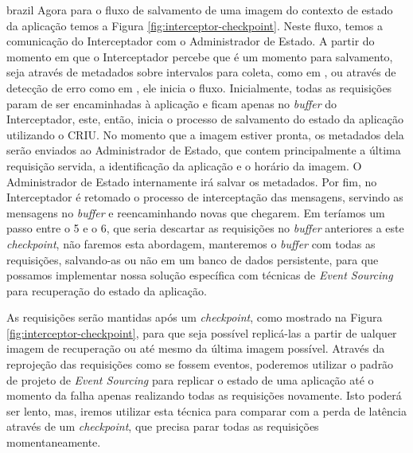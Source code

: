 \begin{otherlanguage*}{brazil}
Agora para o fluxo de salvamento de uma imagem do contexto de estado da aplicação temos a
Figura \ref{fig:interceptor-checkpoint}. Neste fluxo, temos a comunicação do Interceptador
com o Administrador de Estado. A partir do momento em que o Interceptador percebe que é um
momento para salvamento, seja através de metadados sobre intervalos para coleta, como em \cite{vayghan2021kubernetes}, ou através de detecção de erro como em \cite{tran2022proactive},
ele inicia o fluxo. Inicialmente, todas as requisições param de ser encaminhadas à aplicação
e ficam apenas no \textit{buffer} do Interceptador, este, então, inicia o processo de salvamento
do estado da aplicação utilizando o CRIU. No momento que a imagem estiver pronta, os metadados
dela serão enviados ao Administrador de Estado, que contem principalmente a última requisição
servida, a identificação da aplicação e o horário da imagem. O Administrador de Estado internamente
irá salvar os metadados. Por fim, no Interceptador é retomado o processo de interceptação das
mensagens, servindo as mensagens no \textit{buffer} e reencaminhando novas que chegarem. Em \cite{muller2022architecture} teríamos um passo entre o 5 e o 6, que seria descartar as requisições no \textit{buffer} anteriores a este \textit{checkpoint}, não faremos esta abordagem, manteremos o \textit{buffer} com todas as requisições, salvando-as ou não em um banco de dados persistente, para
que possamos implementar nossa solução específica com técnicas de \textit{Event Sourcing} para
recuperação do estado da aplicação.

As requisições serão mantidas após um \textit{checkpoint}, como mostrado na Figura
\ref{fig:interceptor-checkpoint}, para que seja possível replicá-las a partir de 
ualquer imagem de recuperação ou até mesmo da última imagem possível. Através da
reprojeção das requisições como se fossem eventos, poderemos utilizar o padrão de
projeto de \textit{Event Sourcing} \cite{event-sourcing} para replicar o estado de uma
aplicação até o momento da falha apenas realizando todas as requisições novamente.
Isto poderá ser lento, mas, iremos utilizar esta técnica para comparar com a perda
de latência através de um \textit{checkpoint}, que precisa parar todas as requisições
momentaneamente.


\end{otherlanguage*}

